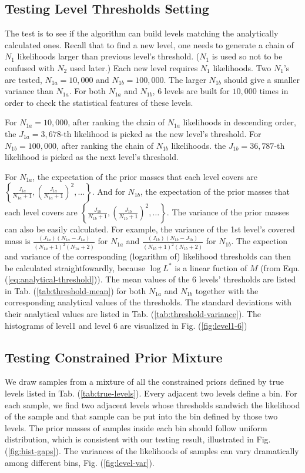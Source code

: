 \documentclass[letterpaper, preprint]{aastex}
\begin{document}
\subsection{Testing Level Thresholds Setting}
The test is to see if the algorithm can build levels matching the analytically calculated ones. Recall that to find a new level, one needs to generate a chain of $N_1$ likelihoods larger than previous level's threshold. ($N_1$ is used so not to be confused with $N_2$ used later.) Each new level requires $N_1$ likelihoods. Two $N_1$'s are tested, $N_{1a} = 10,000$ and $N_{1b} = 100,000$. The larger $N_{1b}$ should give a smaller variance than $N_{1a}$. For both $N_{1a}$ and $N_{1b}$, 6 levels are built  for $10,000$ times in order to check the statistical features of these levels.

For $N_{1a} = 10,000$, after ranking the chain of $N_{1a}$ likelihoods in descending order, the $J_{1a} = 3,678$-th likelihood is picked as the new level's threshold. For $N_{1b} = 100,000$, after ranking the chain of $N_{1b}$ likelihoods. the $J_{1b} = 36,787$-th likelihood is picked as the next level's threshold. 

For $N_{1a}$, the expectation of the prior masses that each level covers are $\left\{\frac{J_{1a}}{N_{1a}+1},\left(\frac{J_{1a}}{N_{1a}+1}\right)^2,\ldots\right\}$. And for $N_{1b}$, the expectation of the prior masses that each level covers are $\left\{\frac{J_{1b}}{N_{1b}+1},\left(\frac{J_{1b}}{N_{1b}+1}\right)^2,\ldots\right\}$. The variance of the prior masses can also be easily calculated. For example, the variance of the 1st level's covered mass is $\frac{(J_{1a})(N_{1a}-J_{1a})}{(N_{1a}+1)^2(N_{1a}+2)}$ for $N_{1a}$ and $\frac{(J_{1b})(N_{1b}-J_{1b})}{(N_{1b}+1)^2(N_{1b}+2)}$ for $N_{1b}$. The expection and variance of the corresponding (logarithm of) likelihood thresholds can then be calculated straightfowardly, because $\log{L^*}$ is a linear fuction of $M$ (from Eqn. (\ref{eq:analytical-threshold})). The mean values of the 6 levels' thresholds are listed in Tab. (\ref{tab:threshold-mean}) for both $N_{1a}$ and $N_{1b}$ together with the corresponding analytical values of the thresholds. The standard deviations with their analytical values are listed in Tab. (\ref{tab:threshold-variance}). The histograms of level1 and level 6 are visualized in Fig. (\ref{fig:level1-6})


\subsection{Testing Constrained Prior Mixture}
We draw samples from a mixture of all the constrained priors defined by true levels listed in Tab. (\ref{tab:true-levels}). Every adjacent two levels define a bin. For each sample, we find two adjacent levels whose thresholds sandwich the likelihood of the sample and that sample can be put into the bin defined by those two levels. The prior masses of samples inside each bin should follow uniform distribution, which is consistent with our testing result, illustrated in Fig. (\ref{fig:hist-gaps}). The variances of the likelihoods of samples can vary dramatically among different bins, Fig. (\ref{fig:level-var}).
\end{document}
